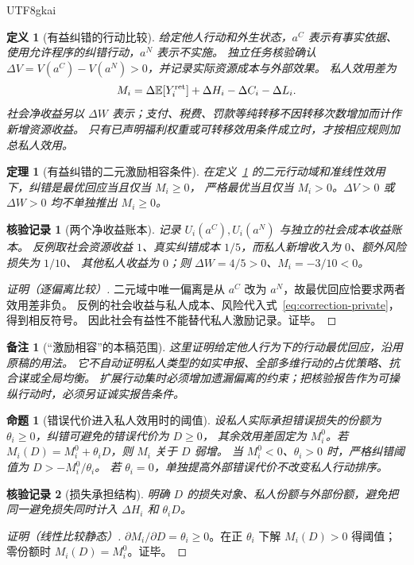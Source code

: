 \documentclass[12pt,a4paper,openany]{report}
\newtheorem{definition}{定义}[chapter]
\newtheorem{theorem}{定理}[chapter]
\newtheorem{proposition}{命题}[chapter]
\newtheorem{remark}{备注}[chapter]
\newtheorem{Certificate}{核验记录}[chapter]
\newcommand{\EE}{\mathbb E}
\newcommand{\Original}{原稿}
\begin{document}
\begin{CJK*}{UTF8}{gkai}
\begin{definition}[有益纠错的行动比较]
\label{def:correction}
给定他人行动和外生状态，$a^C$ 表示有事实依据、使用允许程序的纠错行动，$a^N$ 表示不实施。
独立任务核验确认 $\Delta V=V(a^C)-V(a^N)>0$，并记录实际资源成本与外部效果。
私人效用差为
\begin{equation}\label{eq:correction-private}
 M_i=\Delta\EE[Y_i^{\rm ret}]+\Delta H_i-\Delta C_i-\Delta L_i.
\end{equation}
社会净收益另以 $\Delta W$ 表示；支付、税费、罚款等纯转移不因转移次数增加而计作新增资源收益。
只有已声明福利权重或可转移效用条件成立时，才按相应规则加总私人效用。
\end{definition}

\begin{theorem}[有益纠错的二元激励相容条件]
\label{thm:correction-ic}
在定义~\ref{def:correction} 的二元行动域和准线性效用下，纠错是最优回应当且仅当 $M_i\ge0$，
严格最优当且仅当 $M_i>0$。$\Delta V>0$ 或 $\Delta W>0$ 均不单独推出 $M_i\ge0$。
\end{theorem}
\begin{Certificate}[两个净收益账本]
记录 $U_i(a^C),U_i(a^N)$ 与独立的社会成本收益账本。
反例取社会资源收益 $1$、真实纠错成本 $1/5$，而私人新增收入为 $0$、额外风险损失为 $1/10$、
其他私人收益为 $0$；则 $\Delta W=4/5>0$、$M_i=-3/10<0$。
\end{Certificate}
\begin{proof}[证明（逐偏离比较）]
二元域中唯一偏离是从 $a^C$ 改为 $a^N$，故最优回应恰要求两者效用差非负。
反例的社会收益与私人成本、风险代入式~\eqref{eq:correction-private}，得到相反符号。
因此社会有益性不能替代私人激励记录。证毕。
\end{proof}

\begin{remark}[“激励相容”的本稿范围]
这里证明给定他人行为下的行动最优回应，沿用\Original 的用法。
它不自动证明私人类型的如实申报、全部多维行动的占优策略、抗合谋或全局均衡。
扩展行动集时必须增加遗漏偏离的约束；把核验报告作为可操纵行动时，必须另证诚实报告条件。
\end{remark}

\begin{proposition}[错误代价进入私人效用时的阈值]
\label{prop:loss-threshold}
设私人实际承担错误损失的份额为 $\theta_i\ge0$，纠错可避免的错误代价为 $D\ge0$，
其余效用差固定为 $M_i^0$。若 $M_i(D)=M_i^0+\theta_iD$，则 $M_i$ 关于 $D$ 弱增。
当 $M_i^0<0$、$\theta_i>0$ 时，严格纠错阈值为 $D>-M_i^0/\theta_i$。
若 $\theta_i=0$，单独提高外部错误代价不改变私人行动排序。
\end{proposition}
\begin{Certificate}[损失承担结构]
明确 $D$ 的损失对象、私人份额与外部份额，避免把同一避免损失同时计入 $\Delta H_i$ 和 $\theta_iD$。
\end{Certificate}
\begin{proof}[证明（线性比较静态）]
$\partial M_i/\partial D=\theta_i\ge0$。在正 $\theta_i$ 下解 $M_i(D)>0$ 得阈值；
零份额时 $M_i(D)=M_i^0$。证毕。
\end{proof}


\end{CJK*}
\end{document}
